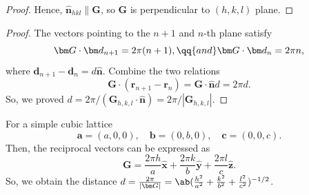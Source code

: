 \begin{solution}
\begin{enumext}
\begin{proof}
\begin{minipage}{.32\linewidth}
      \end{minipage}
      Hence, $\hat{\bm n}_{hkl} \parallel \bm G$, so $\bm G$ is perpendicular
      to $(h, k, l)$ plane.
    \end{proof}
    \item \begin{proof}
    The vectors pointing to the $n + 1$ and $n$-th plane satisfy
    \[
      \bm G \cdot \bm d_{n+1} = 2\pi(n + 1), \qq{and}
      \bm G \cdot \bm d_n = 2\pi n,
    \]
    where $\bm d_{n+1} - \bm d_n = d \hat{\bm n}$. Combine the two relations
    \[
      \bm G \cdot(\bm r_{n+1} - \bm r_n) = \bm G \cdot \bm{\hat n} d = 2\pi d.
    \]
    So, we proved $d = 2\pi/(\bm G_{h,k,l} \cdot \bm{\hat n})
    = 2\pi/|\bm G_{h,k,l}|$.
    \end{proof}
    \item For a simple cubic lattice
    \[
      \bm a = (a,0,0), \quad \bm b = (0,b,0), \quad \bm c = (0,0,c).
    \]
    Then, the reciprocal vectors can be expressed as
    \[
      \bm G = \frac{2\pi h}{a} \bm{\hat x} +
              \frac{2\pi k}{b} \bm{\hat y} +
              \frac{2\pi l}{c} \bm{\hat z}.
    \]
    So, we obtain the distance $d = \frac{2\pi}{|\bm G|}
    = \ab(\frac{h^2}{a^2} + \frac{k^2}{b^2} + \frac{l^2}{c^2})^{-1/2}$.
  \end{enumext}
\end{solution}

